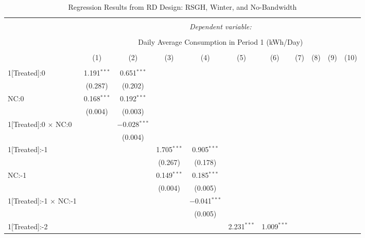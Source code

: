 \begin{table}[!htbp]
\centering 
\caption{Regression Results from RD Design: RSGH, Winter, and No-Bandwidth} 
\label{} 
\footnotesize
\begin{adjustbox}{scale = 0.75}
\begin{tabular}{@{\extracolsep{5pt}}lcccccccccc} 
\\[-1.8ex]\hline 
\hline \\[-1.8ex] 
 & \multicolumn{10}{c}{\textit{Dependent variable:}} \\ 
\cline{2-11} 
\\[-1.8ex] & \multicolumn{10}{c}{Daily Average Consumption in Period 1 (kWh/Day)} \\ 
\\[-1.8ex] & (1) & (2) & (3) & (4) & (5) & (6) & (7) & (8) & (9) & (10)\\ 
\hline \\[-1.8ex] 
 1[Treated]:0 & 1.191$^{***}$ & 0.651$^{***}$ &  &  &  &  &  &  &  &  \\ 
  & (0.287) & (0.202) &  &  &  &  &  &  &  &  \\ 
 NC:0 & 0.168$^{***}$ & 0.192$^{***}$ &  &  &  &  &  &  &  &  \\ 
  & (0.004) & (0.003) &  &  &  &  &  &  &  &  \\ 
 1[Treated]:0 $\times$ NC:0 &  & $-$0.028$^{***}$ &  &  &  &  &  &  &  &  \\ 
  &  & (0.004) &  &  &  &  &  &  &  &  \\ 
 1[Treated]:-1 &  &  & 1.705$^{***}$ & 0.905$^{***}$ &  &  &  &  &  &  \\ 
  &  &  & (0.267) & (0.178) &  &  &  &  &  &  \\ 
 NC:-1 &  &  & 0.149$^{***}$ & 0.185$^{***}$ &  &  &  &  &  &  \\ 
  &  &  & (0.004) & (0.005) &  &  &  &  &  &  \\ 
 1[Treated]:-1 $\times$ NC:-1 &  &  &  & $-$0.041$^{***}$ &  &  &  &  &  &  \\ 
  &  &  &  & (0.005) &  &  &  &  &  &  \\ 
 1[Treated]:-2 &  &  &  &  & 2.231$^{***}$ & 1.009$^{***}$ &  &  &  &  \\ 

\end{tabular}
\end{adjustbox}
\end{table}

